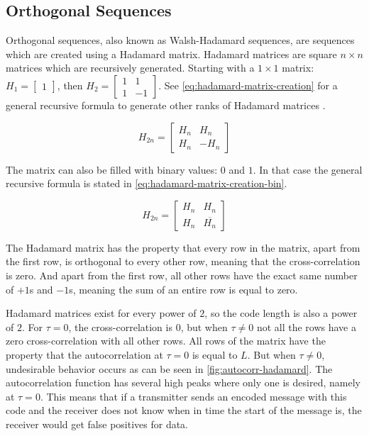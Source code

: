 
\subsection{Orthogonal Sequences}
\label{subsec:orthogonal-sequences}

Orthogonal sequences, also known as Walsh-Hadamard sequences, are sequences which are created using a Hadamard matrix.
Hadamard matrices are square $n \times n$ matrices which are recursively generated.
Starting with a $1 \times 1$ matrix: 
		$H_{1} = \begin{bmatrix} 1 \end{bmatrix}$, then 
		$H_{2} = \begin{bmatrix} 1 & 1 \\ 1 & -1 \end{bmatrix}$.
See \autoref{eq:hadamard-matrix-creation} for a general recursive formula to generate other ranks of Hadamard matrices \cite{714616}.

\begin{equation}
	H_{2n} = 
	\begin{bmatrix} 
		H_n & H_n \\ 
		H_n & -H_n 
	\end{bmatrix}
	\label{eq:hadamard-matrix-creation}
\end{equation}

The matrix can also be filled with binary values: $0$ and $1$. In that case the general recursive formula is stated in \autoref{eq:hadamard-matrix-creation-bin}. 

\begin{equation}
	H_{2n} = 
	\begin{bmatrix} 
		H_n & H_n \\ 
		H_n & \overline{H_n}
	\end{bmatrix}
	\label{eq:hadamard-matrix-creation-bin}
\end{equation}




The Hadamard matrix has the property that every row in the matrix, apart from the first row, is orthogonal to every other row, meaning that the cross-correlation is zero.
And apart from the first row, all other rows have the exact same number of $+1$s and $-1$s, meaning the sum of an entire row is equal to zero.

Hadamard matrices exist for every power of $2$, so the code length is also a power of $2$.
For $\tau = 0$, the cross-correlation is $0$, but when $\tau \neq 0$ not all the rows have a zero cross-correlation with all other rows.
All rows of the matrix have the property that the autocorrelation at $\tau = 0$ is equal to $L$.
But when $\tau \neq 0$, undesirable behavior occurs as can be seen in \autoref{fig:autocorr-hadamard}.
The autocorrelation function has several high peaks where only one is desired, namely at $\tau = 0$.
This means that if a transmitter sends an encoded message with this code and the receiver does not know when in time the start of the message is, the receiver would get false positives for data.


